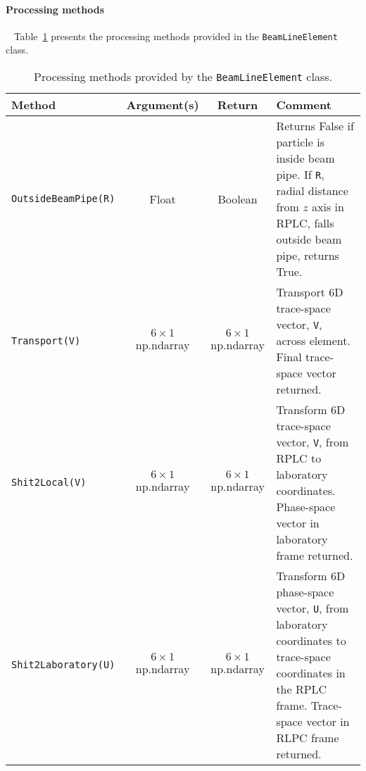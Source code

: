 \paragraph{Processing methods} ~\newline
\noindent
Table~\ref{Tab:BLE:ProcMethods} presents the processing methods provided
in the \texttt{BeamLineElement} class.
\begin{table}[h]
  \caption{
    Processing methods provided by the \texttt{BeamLineElement}
    class. 
  }
  \label{Tab:BLE:ProcMethods}
  \begin{center}
    \begin{tabular}{|l|c|c|p{7cm}|}
      \hline
      \textbf{Method} & \textbf{Argument(s)} & \textbf{Return} & \textbf{Comment}                                            \\
      \hline
      \texttt{OutsideBeamPipe(R)} & Float                 & Boolean               & Returns False if particle is inside beam pipe.
                                                                                    If \texttt{R}, radial distance from $z$ axis in RPLC,
                                                                                    falls outside beam pipe, returns True. \\
      \texttt{Transport(V)}       & $6\times1$ np.ndarray & $6\times1$ np.ndarray & Transport 6D trace-space vector, \texttt{V}, across
                                                                                    element.
                                                                                    Final trace-space vector returned.       \\
      \texttt{Shit2Local(V)}      & $6\times1$ np.ndarray & $6\times1$ np.ndarray & Transform 6D trace-space vector, \texttt{V}, from RPLC
                                                                                    to laboratory coordinates.
                                                                                    Phase-space vector in laboratory frame returned. \\
      \texttt{Shit2Laboratory(U)} & $6\times1$ np.ndarray & $6\times1$ np.ndarray & Transform 6D phase-space vector, \texttt{U}, from 
                                                                                    laboratory coordinates to trace-space coordinates in
                                                                                    the RPLC frame.
                                                                                    Trace-space vector in RLPC frame returned. \\
      \hline
    \end{tabular}
  \end{center}
\end{table}

